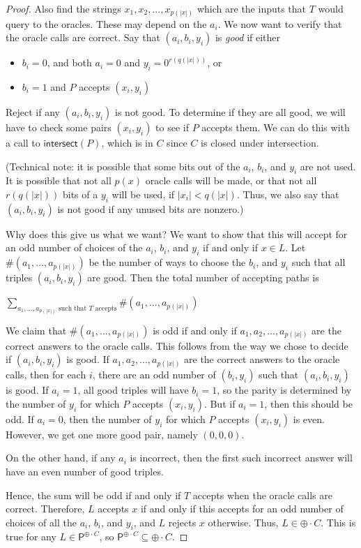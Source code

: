 \documentclass[11pt]{article}
\newcommand{\parity}{\oplus}
\newcommand{\p}{\textsf{P}}
\newcommand{\intersect}{\textsf{intersect}}
\begin{document}
\begin{proof}
Also find the strings $x_1,x_2,...,x_{p(|x|)}$ which are the inputs that $T$ would query to the oracles. These may depend on the $a_i$. We now want to verify that the oracle calls are correct. Say that $(a_i, b_i, y_i)$ is \emph{good} if either
\begin{itemize}
\item $b_i = 0$, and both $a_i = 0$ and $y_i = 0^{r(q(|x|))}$, or
\item $b_i = 1$ and $P$ accepts $(x_i, y_i)$
\end{itemize}
Reject if any $(a_i, b_i, y_i)$ is not good. To determine if they are all good, we will have to check some pairs $(x_i, y_i)$ to see if $P$ accepts them. We can do this with a call to $\intersect(P)$, which is in $C$ since $C$ is closed under intersection.

(Technical note: it is possible that some bits out of the $a_i$, $b_i$, and $y_i$ are not used. It is possible that not all $p(x)$ oracle calls will be made, or that not all $r(q(|x|))$ bits of a $y_i$ will be used, if $|x_i| < q(|x|)$. Thus, we also say that $(a_i, b_i, y_i)$ is not good if any unused bits are nonzero.)

Why does this give us what we want? We want to show that this will accept for an odd number of choices of the $a_i$, $b_i$, and $y_i$ if and only if $x \in L$. Let $\# (a_1,...,a_{p(|x|)})$ be the number of ways to choose the $b_i$, and $y_i$ such that all triples $(a_i,b_i,y_i)$ are good. Then the total number of accepting paths is
\begin{center}$\displaystyle \sum_{a_1,...,a_{p(|x|)}\text{ such that $T$ accepts}}  \#(a_1,...,a_{p(|x|)})$\end{center}
We claim that $ \#(a_1,...,a_{p(|x|)})$ is odd if and only if $a_1,a_2,...,a_{p(|x|)}$ are the correct answers to the oracle calls. This follows from the way we chose to decide if $(a_i, b_i, y_i)$ is good. If $a_1,a_2,...,a_{p(|x|)}$ are the correct answers to the oracle calls, then for each $i$, there are an odd number of $(b_i,y_i)$ such that $(a_i, b_i, y_i)$ is good. If $a_i = 1$, all good triples will have $b_i = 1$, so the parity is determined by the number of $y_i$ for which $P$ accepts $(x_i, y_i)$. But if $a_i = 1$, then this should be odd. If $a_i = 0$, then the number of $y_i$ for which $P$ accepts $(x_i, y_i)$ is even. However, we get one more good pair, namely $(0,0,0)$.

On the other hand, if any $a_i$ is incorrect, then the first such incorrect answer will have an even number of good triples.

Hence, the sum will be odd if and only if $T$ accepts when the oracle calls are correct. Therefore, $L$ accepts $x$ if and only if this accepts for an odd number of choices of all the $a_i$, $b_i$, and $y_i$, and $L$ rejects $x$ otherwise. Thus, $L \in \parity \cdot C$. This is true for any $L \in \p^{\parity \cdot C}$, so $\p^{\parity \cdot C} \subseteq \parity \cdot C$.
\end{proof}
\end{document}
